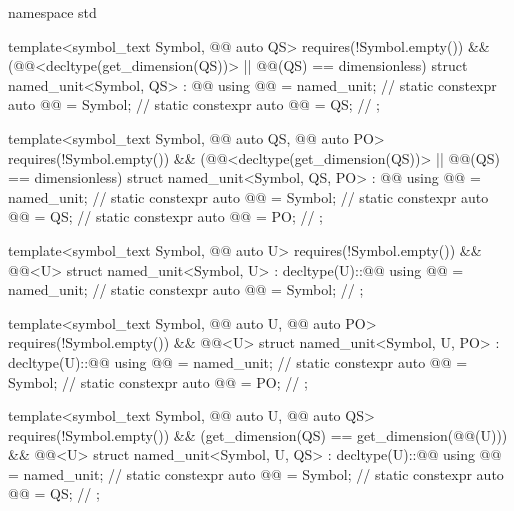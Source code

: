 \begin{codeblock}
namespace std {

template<symbol_text Symbol, @@ auto QS>
  requires(!Symbol.empty()) &&
          (@@<decltype(get_dimension(QS))> || @@(QS) == dimensionless)
struct named_unit<Symbol, QS> : @@ {
  using @@ = named_unit;              // \expos
  static constexpr auto @@ = Symbol;     // \expos
  static constexpr auto @@ = QS;  // \expos
};

template<symbol_text Symbol, @@ auto QS, @@ auto PO>
  requires(!Symbol.empty()) &&
          (@@<decltype(get_dimension(QS))> || @@(QS) == dimensionless)
struct named_unit<Symbol, QS, PO> : @@ {
  using @@ = named_unit;              // \expos
  static constexpr auto @@ = Symbol;     // \expos
  static constexpr auto @@ = QS;  // \expos
  static constexpr auto @@ = PO;   // \expos
};

template<symbol_text Symbol, @@ auto U>
  requires(!Symbol.empty()) && @@<U>
struct named_unit<Symbol, U> : decltype(U)::@@ {
  using @@ = named_unit;              // \expos
  static constexpr auto @@ = Symbol;     // \expos
};

template<symbol_text Symbol, @@ auto U, @@ auto PO>
  requires(!Symbol.empty()) && @@<U>
struct named_unit<Symbol, U, PO> : decltype(U)::@@ {
  using @@ = named_unit;              // \expos
  static constexpr auto @@ = Symbol;     // \expos
  static constexpr auto @@ = PO;   // \expos
};

template<symbol_text Symbol, @@ auto U, @@ auto QS>
  requires(!Symbol.empty()) &&
          (get_dimension(QS) == get_dimension(@@(U))) &&
          @@<U>
struct named_unit<Symbol, U, QS> : decltype(U)::@@ {
  using @@ = named_unit;              // \expos
  static constexpr auto @@ = Symbol;     // \expos
  static constexpr auto @@ = QS;  // \expos
};

}
\end{codeblock}
